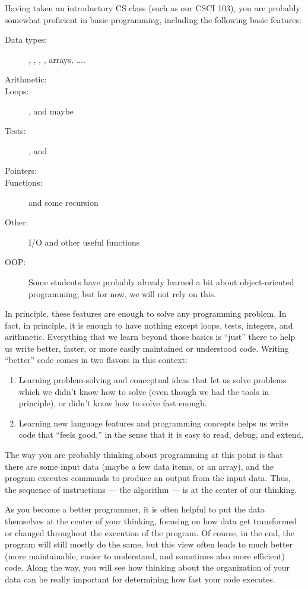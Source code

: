 Having taken an introductory CS class (such as our CSCI 103),
you are probably somewhat proficient in basic programming,
including the following basic features:
\begin{description}
        \item[Data types:] , ,
          , , arrays, $\ldots$.
	\item[Arithmetic:]
	\item[Loops:] ,  and maybe 
	\item[Tests:] ,  and 
	\item[Pointers:]
        \item[Functions:] and some recursion
        \item[Other:] I/O and other useful functions
        \item[OOP:] Some students have probably already learned a bit
          about object-oriented programming, but for now, we will not
          rely on this.
\end{description}

In principle, these features are enough to solve any programming
problem. In fact, in principle, it is enough to have nothing except
 loops,  tests, integers, and arithmetic.
Everything that we learn beyond those basics is ``just''
there to help us write better, faster, or more easily maintained or
understood code.
Writing ``better'' code comes in two flavors in this context:
\begin{enumerate}
\item Learning problem-solving and conceptual ideas that let us solve
  problems which we didn't know how to solve (even though we had the
  tools in principle), or didn't know how to solve fast enough.
\item Learning new language features and programming concepts helps us
  write code that ``feels good,'' in the sense that it is easy to
  read, debug, and extend.
\end{enumerate}

The way you are probably thinking about programming at this
point is that there are some input data
(maybe a few data items, or an array),
and the program executes commands to produce an output from the input data.
Thus, the sequence of instructions --- the algorithm --- is at
the center of our thinking.

As you become a better programmer, it is often helpful to put the data
themselves at the center of your thinking, focusing on how data
get transformed or changed throughout the execution of the program. 
Of course, in the end, the program will still mostly do the same,
but this view often leads to much better (more maintainable, easier to
understand, and sometimes also more efficient) code. 
Along the way, you will see how thinking about the organization of your
data can be really important for determining how fast your code
executes.

